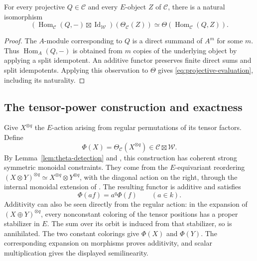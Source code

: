\begin{lemma}\label{lem:projective-evaluation}
For every projective $Q\in\mathcal C$ and every $E$-object $Z$ of
$\mathcal C$, there is a natural isomorphism
\begin{equation}\label{eq:projective-evaluation}
 (\operatorname{Hom}_{\mathcal C}(Q,-)\boxtimes
       \operatorname{Id}_{\mathcal W})(\Theta_{\mathcal C}(Z))
 \simeq\Theta(\operatorname{Hom}_{\mathcal C}(Q,Z)).
\end{equation}
\end{lemma}

\begin{proof}
The $A$-module corresponding to $Q$ is a direct summand of $A^m$
for some $m$.  Thus $\operatorname{Hom}_A(Q,-)$ is obtained from
$m$ copies of the underlying object by applying a split idempotent.
An additive functor preserves finite direct sums and split
idempotents.  Applying this observation to $\Theta$ gives
\eqref{eq:projective-evaluation}, including its naturality.
\end{proof}

\subsection{The tensor-power construction and exactness}

Give $X^{\otimes q}$ the $E$-action arising from regular
permutations of its tensor factors.  Define
\begin{equation}\label{eq:higher-phi}
 \Phi(X)=\Theta_{\mathcal C}(X^{\otimes q})
       \in\mathcal C\boxtimes\mathcal W.
\end{equation}
By Lemma~\ref{lem:theta-detection} and
\cite[Theorem~5.2.1]{CoulembierFlakeHigher}, this construction has
coherent strong symmetric monoidal constraints. They come from the
$E$-equivariant reordering
$(X\otimes Y)^{\otimes q}\simeq X^{\otimes q}\otimes Y^{\otimes q}$,
with the diagonal action on the right, through the internal monoidal
extension of \cite[Section~3.3.2]{CoulembierFlakeHigher}.
The resulting functor is additive and satisfies
\[
 \Phi(af)=a^q\Phi(f)\qquad(a\in k).
\]
Additivity can also be seen directly from the regular action: in the expansion of
$(X\oplus Y)^{\otimes q}$, every nonconstant coloring of the
tensor positions has a proper stabilizer in $E$.  The sum over
its orbit is induced from that stabilizer, so is annihilated.
The two constant colorings give $\Phi(X)$ and $\Phi(Y)$.
The corresponding expansion on morphisms proves additivity,
and scalar multiplication gives the displayed semilinearity.

